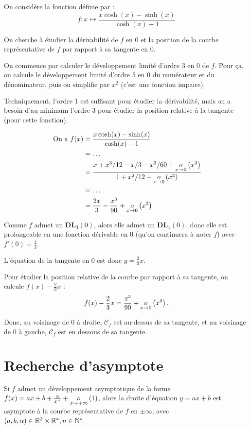 \documentclass[12pt, a4paper]{report}
\begin{document}
\begin{example}
    On considère la fonction définie par :
    $$f:x\mapsto \frac{x\cosh(x)-\sinh(x)}{\cosh(x)-1}$$

    On cherche à étudier la dérivabilité de $f$ en $0$ et la position de la courbe représentative de $f$ par rapport à sa tangente en $0$.

    On commence par calculer le développement limité d'ordre 3 en 0 de $f$. Pour ça, on calcule le développement limité d'ordre 5 en 0 du numérateur et du dénominateur, puis on simplifie par $x^2$ (c'est une fonction impaire).

    Techniquement, l'ordre 1 est suffisant pour étudier la dérivabilité, mais on a besoin d'au minimum l'ordre 3 pour étudier la position relative à la tangente (pour cette fonction).

    \begin{align*}
        \text{ On a } f(x) &= \frac{x\cosh(x)-\sinh(x)}{\cosh(x)-1}\\
        &= \dots\\
        &= \frac{x+x^3/12-x/3-x^3/60+\underset{x\to0}{o}\left(x^3\right)}{1+x^2/12+\underset{x\to0}{o}\left(x^2\right)}\\
        &= \dots\\
        &= \frac{2x}{3} - \frac{x^3}{90} + \underset{x\to0}{o}\left(x^3\right)
    \end{align*}

    Comme $f$ admet un $\mathbf{DL}_3(0)$, alors elle admet un $\mathbf{DL}_1(0)$, donc elle est prolongeable en une fonction dérivable en $0$ (qu'on continuera  à noter $f$) avec $f'(0)=\frac{2}{3}$.

    L'équation de la tangente en $0$ est donc $y=\frac{2}{3}x$.

    Pour étudier la position relative de la courbe par rapport à sa tangente, on calcule $f(x) - \frac{2}{3}x$ :
    $$f(x) - \frac{2}{3}x = \frac{x^3}{90} + \underset{x\to0}{o}\left(x^3\right).$$

    Donc, au voisinage de $0$ à droite, $\mathcal{C}_f$ est au-dessus de sa tangente, et au voisinage de $0$ à gauche, $\mathcal{C}_f$ est en dessous de sa tangente.
\end{example}

\section{Recherche d'asymptote}

Si $f$ admet un développement asymptotique de la forme $f(x) = ax + b + \frac{\alpha}{x^n} + \underset{x\to+\infty}{o}\left(1\right)$, alors la droite d'équation $y = ax + b$ est asymptote à la courbe représentative de $f$ en $\pm\infty$, avec $(a,b,\alpha)\in \mathbb{R}^2\times\mathbb{R}^*,n\in\mathbb{N}^*$.
\end{document}
